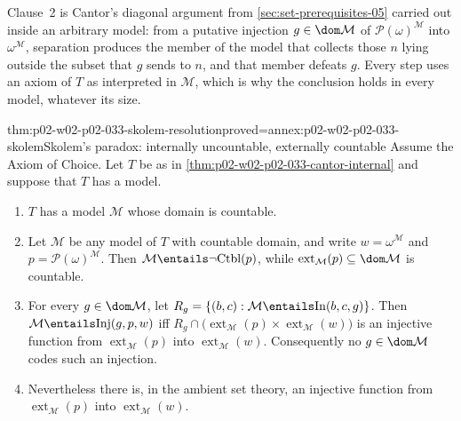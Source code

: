 Clause~2 is Cantor's diagonal argument from \cref{sec:set-prerequisites-05}
carried out inside an arbitrary model: from a putative injection
\(g\in\dom\mathcal M\) of \(\mathcal P(\omega)^{\mathcal M}\) into
\(\omega^{\mathcal M}\), separation produces the member of the model that
collects those \(n\) lying outside the subset that \(g\) sends to \(n\), and
that member defeats \(g\).  Every step uses an axiom of \(T\) as interpreted
in \(\mathcal M\), which is why the conclusion holds in every model,
whatever its size.

\begin{hbtheorem}{thm:p02-w02-p02-033-skolem-resolution}{proved=annex:p02-w02-p02-033-skolem}{Skolem's paradox: internally uncountable, externally countable}
Assume the Axiom of Choice.  Let \(T\) be as in
\cref{thm:p02-w02-p02-033-cantor-internal} and suppose that \(T\) has a
model.
\begin{enumerate}
  \item \(T\) has a model \(\mathcal M\) whose domain is countable.
  \item Let \(\mathcal M\) be any model of \(T\) with countable domain, and
        write \(w=\omega^{\mathcal M}\) and
        \(p=\mathcal P(\omega)^{\mathcal M}\).  Then
        \(\mathcal M\entails\neg\mathrm{Ctbl}(p)\), while
        \(\operatorname{ext}_{\mathcal M}(p)\subseteq\dom\mathcal M\) is
        countable.
  \item For every \(g\in\dom\mathcal M\), let
        \(R_g=\{(b,c):\mathcal M\entails\mathrm{In}(b,c,g)\}\).  Then
        \(\mathcal M\entails\mathrm{Inj}(g,p,w)\) iff
        \(R_g\cap\bigl(\operatorname{ext}_{\mathcal M}(p)\times
        \operatorname{ext}_{\mathcal M}(w)\bigr)\) is an injective function
        from \(\operatorname{ext}_{\mathcal M}(p)\) into
        \(\operatorname{ext}_{\mathcal M}(w)\).  Consequently no
        \(g\in\dom\mathcal M\) codes such an injection.
  \item Nevertheless there is, in the ambient set theory, an injective
        function from \(\operatorname{ext}_{\mathcal M}(p)\) into
        \(\operatorname{ext}_{\mathcal M}(w)\).
\end{enumerate}
\end{hbtheorem}

